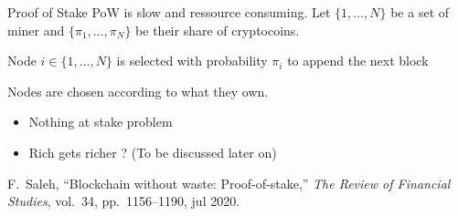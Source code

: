 \documentclass{beamer}
\begin{document}
\begin{frame}{Proof of Stake}
PoW is slow and ressource consuming. Let $\{1,\ldots, N\}$ be a set of miner and $\{\pi_1,\ldots, \pi_N\}$ be their share of cryptocoins.
\begin{tcolorbox}[enhanced,drop shadow, title=PoS]
Node $i\in \{1,\ldots, N\}$ is selected with probability $\pi_i$ to append the next block
\end{tcolorbox}
\vspace{0.3cm}
Nodes are chosen according to what they own.
\begin{itemize}
  \item Nothing at stake problem
  \item Rich gets richer ? (To be discussed later on)
\end{itemize}
\footnotesize{
\begin{thebibliography}{1}

F.~Saleh, ``Blockchain without waste: Proof-of-stake,'' {\em The Review of
  Financial Studies}, vol.~34, pp.~1156--1190, jul 2020.

\end{thebibliography}}

\end{frame}
\end{document}
